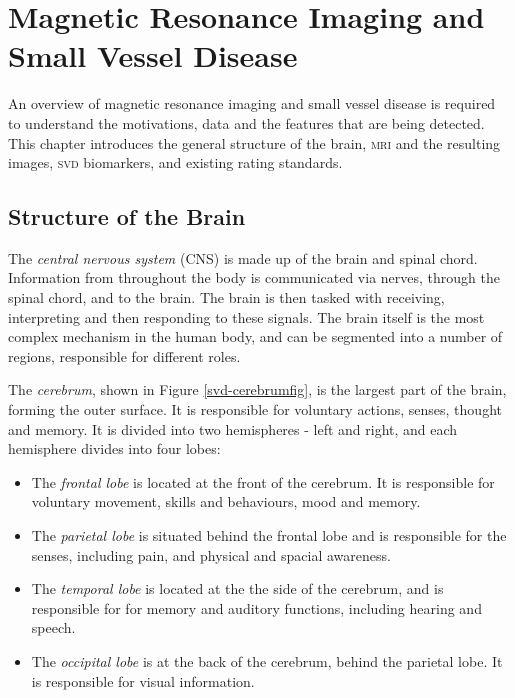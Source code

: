 %
%



\chapter{Magnetic Resonance Imaging and Small Vessel Disease}\label{mri_svd_intro}

An overview of magnetic resonance imaging and small vessel disease is required to understand the motivations, data and the features that are being detected. This chapter introduces the general structure of the brain, \textsc{mri} and the resulting images, \textsc{svd} biomarkers, and existing rating standards.

\section{Structure of the Brain}\label{svd-brain}

The \textit{central nervous system} (CNS) is made up of the brain and spinal chord. Information from throughout the body is communicated via nerves, through the spinal chord, and to the brain. The brain is then tasked with receiving, interpreting and then responding to these signals. The brain itself is the most complex mechanism in the human body, and can be segmented into a number of regions, responsible for different roles. 

The \textit{cerebrum}, shown in Figure \ref{svd-cerebrumfig}, is the largest part of the brain, forming the outer surface. It is responsible for voluntary actions, senses, thought and memory. It is divided into two hemispheres - left and right, and each hemisphere divides into four lobes:
 \begin{itemize}
	\item The \textit{frontal lobe} is located at the front of the cerebrum. It is responsible for voluntary movement, skills and behaviours, mood and memory.
	\item The \textit{parietal lobe} is situated behind the frontal lobe and is responsible for the senses, including pain, and physical and spacial awareness.
	\item The \textit{temporal lobe} is located at the the side of the cerebrum, and is responsible for for memory and auditory functions, including hearing and speech.
	\item The \textit{occipital lobe} is at the back of the cerebrum, behind the parietal lobe. It is responsible for visual information.
\end{itemize}

